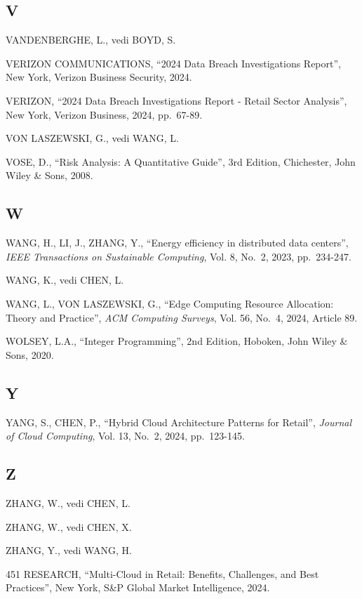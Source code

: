 \documentclass{report}
\begin{document}
\subsection{V}\label{v-1}

VANDENBERGHE, L., vedi BOYD, S.

VERIZON COMMUNICATIONS, ``2024 Data Breach Investigations Report'', New
York, Verizon Business Security, 2024.

VERIZON, ``2024 Data Breach Investigations Report - Retail Sector
Analysis'', New York, Verizon Business, 2024, pp.~67-89.

VON LASZEWSKI, G., vedi WANG, L.

VOSE, D., ``Risk Analysis: A Quantitative Guide'', 3rd Edition,
Chichester, John Wiley \& Sons, 2008.

\subsection{W}\label{w-1}

WANG, H., LI, J., ZHANG, Y., ``Energy efficiency in distributed data
centers'', \emph{IEEE Transactions on Sustainable Computing}, Vol. 8,
No.~2, 2023, pp.~234-247.

WANG, K., vedi CHEN, L.

WANG, L., VON LASZEWSKI, G., ``Edge Computing Resource Allocation:
Theory and Practice'', \emph{ACM Computing Surveys}, Vol. 56, No.~4,
2024, Article 89.

WOLSEY, L.A., ``Integer Programming'', 2nd Edition, Hoboken, John Wiley
\& Sons, 2020.

\subsection{Y}\label{y}

YANG, S., CHEN, P., ``Hybrid Cloud Architecture Patterns for Retail'',
\emph{Journal of Cloud Computing}, Vol. 13, No.~2, 2024, pp.~123-145.

\subsection{Z}\label{z-1}

ZHANG, W., vedi CHEN, L.

ZHANG, W., vedi CHEN, X.

ZHANG, Y., vedi WANG, H.

451 RESEARCH, ``Multi-Cloud in Retail: Benefits, Challenges, and Best
Practices'', New York, S\&P Global Market Intelligence, 2024.
\end{document}

